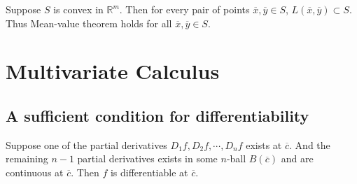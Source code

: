 \begin{remark}
	Suppose $S$ is convex in $\mathbb{R}^m$.
	Then for every pair of points $\overline{x},\overline{y} \in S$, $L(\overline{x},\overline{y}) \subset S$.
	Thus Mean-value theorem holds for all $\overline{x},\overline{y} \in S$.
\end{remark}

\section{Multivariate Calculus}
\subsection{A sufficient condition for differentiability}
\begin{theorem}
	Suppose one of the partial derivatives $D_1f,D_2f,\cdots,D_nf$ exists at $\overline{c}$.
	And the remaining $n-1$ partial derivatives exists in some $n$-ball $B(\overline{c})$ and are continuous at $\overline{c}$.
	Then $f$ is differentiable at $\overline{c}$.
\end{theorem}
